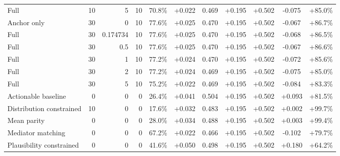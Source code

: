 \begin{table}[htbp]
\begin{tabular}{lrrrccccccc}
Full & 10 & 5 & 10 & 70.8\% & +0.022 & 0.469 & +0.195 & +0.502 & -0.075 & +85.0\% \\
Anchor only & 30 & 0 & 10 & 77.6\% & +0.025 & 0.470 & +0.195 & +0.502 & -0.067 & +86.7\% \\
Full & 30 & 0.174734 & 10 & 77.6\% & +0.025 & 0.470 & +0.195 & +0.502 & -0.068 & +86.5\% \\
Full & 30 & 0.5 & 10 & 77.6\% & +0.025 & 0.470 & +0.195 & +0.502 & -0.067 & +86.6\% \\
Full & 30 & 1 & 10 & 77.2\% & +0.024 & 0.470 & +0.195 & +0.502 & -0.072 & +85.6\% \\
Full & 30 & 2 & 10 & 77.2\% & +0.024 & 0.469 & +0.195 & +0.502 & -0.075 & +85.0\% \\
Full & 30 & 5 & 10 & 75.2\% & +0.022 & 0.469 & +0.195 & +0.502 & -0.084 & +83.3\% \\
Actionable baseline & 0 & 0 & 0 & 26.4\% & +0.041 & 0.504 & +0.195 & +0.502 & +0.093 & +81.5\% \\
Distribution constrained & 10 & 0 & 0 & 17.6\% & +0.032 & 0.483 & +0.195 & +0.502 & +0.002 & +99.7\% \\
Mean parity & 0 & 0 & 0 & 28.0\% & +0.034 & 0.488 & +0.195 & +0.502 & +0.003 & +99.4\% \\
Mediator matching & 0 & 0 & 0 & 67.2\% & +0.022 & 0.466 & +0.195 & +0.502 & -0.102 & +79.7\% \\
Plausibility constrained & 0 & 0 & 0 & 41.6\% & +0.050 & 0.498 & +0.195 & +0.502 & +0.180 & +64.2\% \\
\bottomrule
\end{tabular}
\end{table}